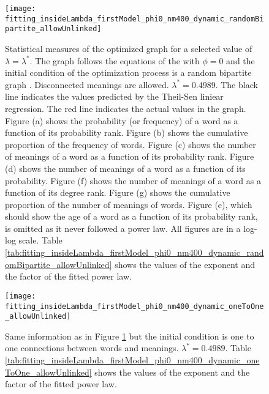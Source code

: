\begin{figure}
  \centering
  \texttt{[image: fitting\_insideLambda\_firstModel\_phi0\_nm400\_dynamic\_randomBipartite\_allowUnlinked]}
  \caption{
    Statistical measures of the optimized graph for a selected value of $\lambda=\lambda^*$.
    The graph follows the equations of the \firstmodel{} with $\phi=0$ and the initial condition of the optimization process is a random bipartite graph . Disconnected meanings are allowed.
    $\lambda^*=0.4989$.
    The black line indicates the values predicted by the Theil-Sen liniear regression.
    The red line indicates the actual values in the graph.
    Figure (a) shows the probability (or frequency) of a word as a function of its probability rank.
    Figure (b) shows the cumulative proportion of the frequency of words.
    Figure (c) shows the number of meanings of a word as a function of its probability rank.
    Figure (d) shows the number of meanings of a word as a function of its probability.
    Figure (f) shows the number of meanings of a word as a function of its degree rank.
    Figure (g) shows the cumulative proportion of the number of meanings of words.
    Figure (e), which should show the age of a word as a function of its probability rank, is omitted as it never followed a power law.
    All figures are in a log-log scale.
    Table \ref{tab:fitting_insideLambda_firstModel_phi0_nm400_dynamic_randomBipartite_allowUnlinked} shows the values of the exponent and the factor of the fitted power law.
  }
  \label{fig:fitting_insideLambda_firstModel_phi0_nm400_dynamic_randomBipartite_allowUnlinked}
\end{figure}

\begin{figure}
  \centering
  \texttt{[image: fitting\_insideLambda\_firstModel\_phi0\_nm400\_dynamic\_oneToOne\_allowUnlinked]}
  \caption{Same information as in Figure \ref{fig:fitting_insideLambda_firstModel_phi0_nm400_dynamic_randomBipartite_allowUnlinked} but the initial condition is one to one connections between words and meanings. $\lambda^*=0.
4989$.
Table \ref{tab:fitting_insideLambda_firstModel_phi0_nm400_dynamic_oneToOne_allowUnlinked} shows the values of the exponent and the factor of the fitted power law.}
  \label{fig:fitting_insideLambda_firstModel_phi0_nm400_dynamic_oneToOne_allowUnlinked}
\end{figure}



